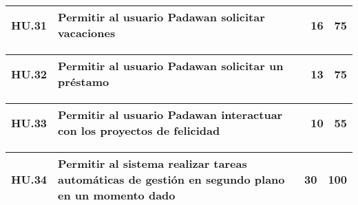 \begin{table}[h]
	\centering
	\begin{tabular}{| p{2.3cm} | p{5.1cm} | p{2cm} | p{1.6cm} |}
		\hline 
		HU.31 & Permitir al usuario Padawan solicitar vacaciones & 16 & 75 \\ \hline 
	\end{tabular}
\end{table}

\begin{table}[h]
	\centering
	\begin{tabular}{| p{2.3cm} | p{5.1cm} | p{2cm} | p{1.6cm} |}
		\hline 
		HU.32 & Permitir al usuario Padawan solicitar un préstamo & 13 & 75 \\ \hline 
	\end{tabular}
\end{table}

\begin{table}[h]
	\centering
	\begin{tabular}{| p{2.3cm} | p{5.1cm} | p{2cm} | p{1.6cm} |}
		\hline 
		HU.33 & Permitir al usuario Padawan interactuar con los proyectos de felicidad & 10 & 55 \\ \hline 
	\end{tabular}
\end{table}

\begin{table}[h]
	\centering
	\begin{tabular}{| p{2.3cm} | p{5.1cm} | p{2cm} | p{1.6cm} |}
		\hline 
		HU.34 & Permitir al sistema realizar tareas automáticas de gestión en segundo plano en un momento dado & 30 & 100 \\ \hline 
	\end{tabular}
\end{table}

\FloatBarrier        
